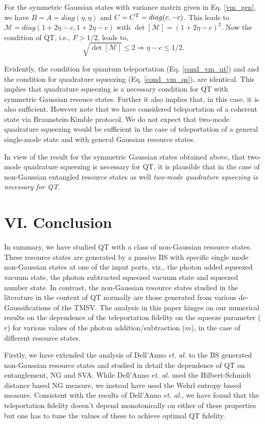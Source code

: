 \documentclass[letter,scriptaddress,twocolumn, prl,showkeys]{revtex4}
\begin{document}
For the symmetric Gaussian states with variance matrix given in Eq. \ref{vm_gen}, we have $B=A=diag(\eta,\eta)$ and $C=C^{\rm{T}}=diag(c,-c)$. This leads to $\mathscr{M}=diag(1+2\overline{\eta-c},1+2\overline{\eta-c})$ with $\det [\mathscr{M}]=(1+2\overline{\eta -c})^{2}$. Now the condition of QT, i.e., $F>1/2$, leads to,
\begin{equation}
\sqrt{\det[\mathscr{M}]}\leq 2 \Rightarrow \eta-c \leq 1/2 .
\label{cond_vm_qt}
\end{equation}

Evidently,
the condition for quantum teleportation
(Eq. \ref{cond_vm_qt}) and
and the condition for quadrature squeezing (Eq.  \ref{cond_vm_qs}),
are identical. This implies that quadrature squeezing is a necessary
condition for QT with symmetric Gaussian resouce states. Further it
also implies that, in this case, it is also sufficient. However note
that we have considered teleportation of a coherent state via
Braunstein-Kimble protocol. We do
not expect that two-mode quadrature squeezing would be sufficient
in the case of teleportation of a general single-mode state and with general
Gaussian resource states.

In view of the result for the symmetric Gaussian states obtained above, that two-mode quadrature squeezing is necessary for QT, it is plausible that in the case of non-Gaussian entangled resource states as well {\it two-mode quadrature squeezing is necessary for QT}. 
 
\section*{VI. Conclusion}

In summary, we have studied QT with a class of non-Gaussian resource states.
These resource states are generated by a passive BS with specific single mode non-Gaussian states at one of the input ports, viz., the photon added squeezed vacuum state, the photon subtracted squeezed vacuum state and squeezed number state.
In contrast, the non-Gaussian resource states studied in the literature in the context of QT normally are those generated from various de-Gaussifications of the TMSV.
The analysis in this paper hinges on our numerical results on the dependence of the teleportation fidelity on the squeeze parameter ($r$) for various values of the photon addition/subtraction ($m$), in the case of different resource states.

Firstly, we have extended the analysis of Dell'Anno \emph{et. al.} \cite{tp_illuminati} to the BS generated non-Gaussian resource states and studied in detail the dependence of QT on entanglement, NG and SVA.
While Dell'Anno \emph{et. al.} used the Hilbert-Schmidt distance based NG measure, we instead have used the Wehrl entropy based measure.
Consistent with the results of Dell'Anno \emph{et. al.}, we have found that the teleportation fidelity doesn't depend monotonically on either of these properties but one has to tune the values of these to achieve optimal QT fidelity.
\end{document}
